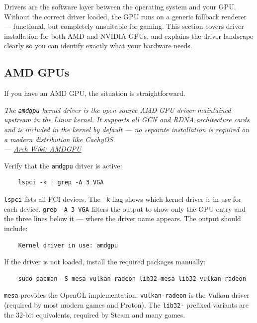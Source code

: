\documentclass{article}
\newcommand{\code}[1]{\colorbox{codebg}{\texttt{#1}}}
\begin{document}
Drivers are the software layer between the operating system and your GPU. Without
the correct driver loaded, the GPU runs on a generic fallback renderer ---
functional, but completely unsuitable for gaming. This section covers driver
installation for both AMD and NVIDIA GPUs, and explains the driver landscape
clearly so you can identify exactly what your hardware needs.

\subsection{AMD GPUs}

If you have an AMD GPU, the situation is straightforward.

\begin{mdframed}[linewidth=1.5pt, linecolor=black!50, topline=true, bottomline=true,
	leftline=false, rightline=false, backgroundcolor=black!3]
	\small\itshape
	The \texttt{amdgpu} kernel driver is the open-source AMD GPU driver maintained
	upstream in the Linux kernel. It supports all GCN and RDNA architecture cards
	and is included in the kernel by default --- no separate installation is required
	on a modern distribution like CachyOS.\\[4pt]
	\normalfont\small ---
	\href{https://wiki.archlinux.org/title/AMDGPU}{Arch Wiki: AMDGPU}
\end{mdframed}

\noindent Verify that the \code{amdgpu} driver is active:

\begin{verbatim}
	lspci -k | grep -A 3 VGA
\end{verbatim}

\noindent \code{lspci} lists all PCI devices. The \code{-k} flag shows which kernel driver
is in use for each device. \code{grep -A 3 VGA} filters the output to show only
the GPU entry and the three lines below it --- where the driver name appears. The
output should include:

\begin{verbatim}
	Kernel driver in use: amdgpu
\end{verbatim}

\noindent If the driver is not loaded, install the required packages manually:

\begin{verbatim}
	sudo pacman -S mesa vulkan-radeon lib32-mesa lib32-vulkan-radeon
\end{verbatim}

\code{mesa} provides the OpenGL implementation. \code{vulkan-radeon} is the
Vulkan driver (required by most modern games and Proton). The \code{lib32-}
prefixed variants are the 32-bit equivalents, required by Steam and many games.
\end{document}
